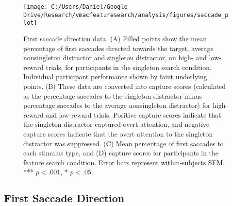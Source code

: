 \documentclass[jou, a4paper, noextraspace,floatsintext]{apa6}
\theoremstyle{definition}
\theoremstyle{definition}
\theoremstyle{definition}
\theoremstyle{remark}
\begin{document}
\begin{figure}

{\centering \texttt{[image: C:/Users/Daniel/Google Drive/Research/vmacfeaturesearch/analysis/figures/saccade\_plot]} 

}

\caption{First saccade direction data. (A) Filled points show
the mean percentage of first saccades directed towards the target,
average nonsingleton distractor and singleton distractor, on high- and
low-reward trials, for participants in the singleton search condition.
Individual participant performance shown by faint underlying points. (B)
These data are converted into capture scores (calculated as the
percentage saccades to the singleton distractor minus percentage
saccades to the average nonsingleton distractor) for high-reward and
low-reward trials. Positive capture scores indicate that the singleton
distractor captured overt attention, and negative capture scores
indicate that the overt attention to the singleton distractor was
suppressed. (C) Mean percentage of first saccades to each stimulus type,
and (D) capture scores for participants in the feature search condition.
Error bars represent within-subjects SEM. *** \(p<.001\), * \(p<.05\).}\label{fig:SaccadePlot}
\end{figure}

\subsection{First Saccade Direction}\label{first-saccade-direction}
\end{document}
